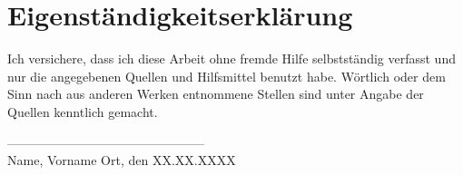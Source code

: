 \section*{Eigenständigkeitserklärung}%
Ich versichere, dass ich diese Arbeit ohne fremde Hilfe selbstständig verfasst und nur die angegebenen Quellen und Hilfsmittel benutzt habe. Wörtlich oder dem Sinn nach aus anderen Werken entnommene Stellen sind unter Angabe der Quellen kenntlich gemacht.
\vspace{1cm}%
\begin{flushleft}%
-----------------------------------------------\\%
Name, Vorname%
\hfill%
Ort, den XX.XX.XXXX%
\end{flushleft}%
